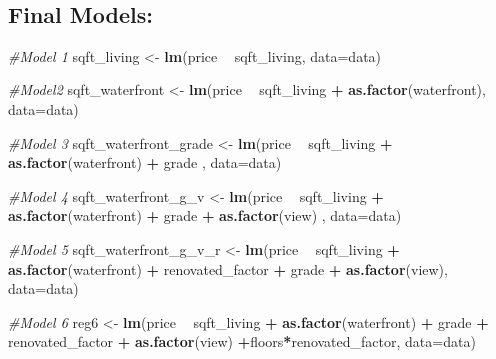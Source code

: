 \documentclass[
]{article}
\newenvironment{Shaded}{\begin{snugshade}}{\end{snugshade}}
\newcommand{\CommentTok}[1]{\textcolor[rgb]{0.56,0.35,0.01}{\textit{#1}}}
\newcommand{\DataTypeTok}[1]{\textcolor[rgb]{0.13,0.29,0.53}{#1}}
\newcommand{\KeywordTok}[1]{\textcolor[rgb]{0.13,0.29,0.53}{\textbf{#1}}}
\newcommand{\NormalTok}[1]{#1}
\newcommand{\OperatorTok}[1]{\textcolor[rgb]{0.81,0.36,0.00}{\textbf{#1}}}
\newcommand{\StringTok}[1]{\textcolor[rgb]{0.31,0.60,0.02}{#1}}
\begin{document}
~

\hypertarget{final-models}{%
\subsection{Final Models:}\label{final-models}}

\begin{Shaded}
\begin{Highlighting}[]
\CommentTok{#Model 1}
\NormalTok{sqft_living <-}\StringTok{ }\KeywordTok{lm}\NormalTok{(price }\OperatorTok{~}\StringTok{ }\NormalTok{sqft_living, }\DataTypeTok{data=}\NormalTok{data)}

\CommentTok{#Model2}
\NormalTok{sqft_waterfront <-}\StringTok{  }\KeywordTok{lm}\NormalTok{(price }\OperatorTok{~}\StringTok{ }\NormalTok{sqft_living }\OperatorTok{+}\StringTok{ }\KeywordTok{as.factor}\NormalTok{(waterfront), }\DataTypeTok{data=}\NormalTok{data)}

\CommentTok{#Model 3}
\NormalTok{sqft_waterfront_grade <-}\StringTok{  }\KeywordTok{lm}\NormalTok{(price }\OperatorTok{~}\StringTok{ }\NormalTok{sqft_living }\OperatorTok{+}\StringTok{ }\KeywordTok{as.factor}\NormalTok{(waterfront) }\OperatorTok{+}\StringTok{ }\NormalTok{grade , }\DataTypeTok{data=}\NormalTok{data)}

\CommentTok{#Model 4}
\NormalTok{sqft_waterfront_g_v <-}\StringTok{  }\KeywordTok{lm}\NormalTok{(price }\OperatorTok{~}\StringTok{ }\NormalTok{sqft_living }\OperatorTok{+}\StringTok{ }\KeywordTok{as.factor}\NormalTok{(waterfront) }\OperatorTok{+}\StringTok{ }\NormalTok{grade }\OperatorTok{+}\StringTok{ }\KeywordTok{as.factor}\NormalTok{(view) , }\DataTypeTok{data=}\NormalTok{data)}

\CommentTok{#Model 5}
\NormalTok{sqft_waterfront_g_v_r <-}\StringTok{  }\KeywordTok{lm}\NormalTok{(price }\OperatorTok{~}\StringTok{ }\NormalTok{sqft_living }\OperatorTok{+}\StringTok{ }\KeywordTok{as.factor}\NormalTok{(waterfront) }\OperatorTok{+}\StringTok{ }\NormalTok{renovated_factor }\OperatorTok{+}\StringTok{ }\NormalTok{grade }\OperatorTok{+}\StringTok{ }\KeywordTok{as.factor}\NormalTok{(view), }\DataTypeTok{data=}\NormalTok{data)}

\CommentTok{#Model 6}
\NormalTok{reg6 <-}\StringTok{ }\KeywordTok{lm}\NormalTok{(price }\OperatorTok{~}\StringTok{ }\NormalTok{sqft_living }\OperatorTok{+}\StringTok{ }\KeywordTok{as.factor}\NormalTok{(waterfront) }\OperatorTok{+}\StringTok{ }\NormalTok{grade }\OperatorTok{+}\StringTok{ }\NormalTok{renovated_factor }\OperatorTok{+}\StringTok{ }\KeywordTok{as.factor}\NormalTok{(view) }\OperatorTok{+}\NormalTok{floors}\OperatorTok{*}\NormalTok{renovated_factor, }\DataTypeTok{data=}\NormalTok{data)}



\end{Highlighting}
\end{Shaded}
\end{document}
